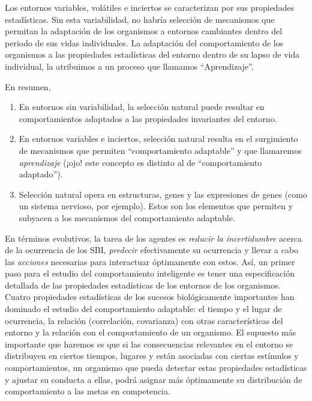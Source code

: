 \documentclass[
  letterpaper,
]{book}
\begin{document}
Los entornos variables, volátiles e inciertos se caracterizan por sus
propiedades estadísticas. Sin esta variabilidad, no habría selección de
mecanismos que permitan la adaptación de los organismos a entornos
cambiantes dentro del periodo de sus vidas individuales. La adaptación
del comportamiento de los organismos a las propiedades estadísticas del
entorno dentro de su lapso de vida individual, la atribuimos a un
proceso que llamamos ``Aprendizaje''.

En resumen,

\begin{enumerate}
\def\labelenumi{\arabic{enumi}.}
\item
  En entornos sin variabilidad, la selección natural puede resultar en
  comportamientos adaptados a las propiedades invariantes del entorno.
\item
  En entornos variables e inciertos, selección natural resulta en el
  surgimiento de mecanismos que permiten ``comportamiento adaptable'' y
  que llamaremos \emph{aprendizaje} (¡ojo! este concepto es distinto al
  de ``comportamiento adaptado'').
\item
  Selección natural opera en estructuras, genes y las expresiones de
  genes (como un sistema nervioso, por ejemplo). Estos son los elementos
  que permiten y subyacen a los mecanismos del comportamiento adaptable.
\end{enumerate}

En términos evolutivos, la tarea de los agentes es \emph{reducir la
incertidumbre} acerca de la ocurrencia de los SBI, \emph{predecir}
efectivamente su ocurrencia y llevar a cabo las \emph{acciones}
necesarias para interactuar óptimamente con estos. Así, un primer paso
para el estudio del comportamiento inteligente es tener una
especificación detallada de las propiedades estadísticas de los entornos
de los organismos. Cuatro propiedades estadísticas de los sucesos
biológicamente importantes han dominado el estudio del comportamiento
adaptable: el tiempo y el lugar de ocurrencia, la relación (correlación,
covarianza) con otras características del entorno y la relación con el
comportamiento de un organismo. El supuesto más importante que haremos
es que si las consecuencias relevantes en el entorno se distribuyen en
ciertos tiempos, lugares y están asociadas con ciertas estímulos y
comportamientos, un organismo que pueda detectar estas propiedades
estadísticas y ajustar su conducta a ellas, podrá asignar más
óptimamente su distribución de comportamiento a las metas en
competencia.
\end{document}
